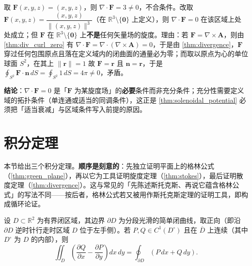 \begin{example}\label{ex:solenoidal_not_curl}
取 $\mathbf F(x,y,z) = (x,y,z)$，则 $\nabla\cdot\mathbf F = 3\ne0$，不合条件。改取 $\mathbf F(x,y,z)=\dfrac{(x,y,z)}{\|(x,y,z)\|^3}$（在 $\mathbb R^3\setminus\{\mathbf 0\}$ 上定义），则 $\nabla\cdot\mathbf F=0$ 在该区域上处处成立；但 $\mathbf F$ 在 $\mathbb R^3\setminus\{\mathbf 0\}$ 上\textbf{不是}任何矢量场的旋度。理由：若 $\mathbf F=\nabla\times\mathbf A$，则由 \cref{thm:div_curl_zero} 有 $\nabla\cdot\mathbf F = \nabla\cdot(\nabla\times\mathbf A)=0$，于是由 \cref{thm:divergence}，$\mathbf F$ 穿过任何包围原点且落在定义域内的闭曲面的通量必为零；而取以原点为心的单位球面 $S^2$，在其上 $\|\mathbf r\|=1$ 故 $\mathbf F=\mathbf r$ 且 $\mathbf n=\mathbf r$，于是 $\oint_{S^2}\mathbf F\cdot\mathbf n\,dS=\oint_{S^2}1\,dS=4\pi\ne0$，矛盾。

\textbf{结论}：$\nabla\cdot\mathbf F=0$ 是「$\mathbf F$ 为某旋度场」的\textbf{必要}条件而非充分条件；充分性需要定义域的拓扑条件（单连通或适当的同调条件），这正是 \cref{thm:solenoidal_potential} 必须把「适当衰减」与区域条件写入前提的原因。
\end{example}

\section{积分定理}\label{sec:integral_theorems}

本节给出三个积分定理。\textbf{顺序是刻意的}：先独立证明平面上的格林公式（\cref{thm:green_plane}），再以它为工具证明旋度定理（\cref{thm:stokes}），最后证明散度定理（\cref{thm:divergence}）。这与常见的「先陈述斯托克斯、再说它蕴含格林公式」的写法不同——按后者，格林公式若又被用作斯托克斯定理的证明工具，即构成循环论证。

\begin{theorem}\label{thm:green_plane}
设 $D \subset \mathbb{R}^2$ 为有界闭区域，其边界 $\partial D$ 为分段光滑的简单闭曲线，取正向（即沿 $\partial D$ 逆时针行走时区域 $D$ 位于左手侧）。若 $P, Q \in C^1(D^\circ)$ 且在 $\overline{D}$ 上连续（其中 $D^\circ$ 为 $D$ 的内部），则
\[
\iint_D \left( \frac{\partial Q}{\partial x} - \frac{\partial P}{\partial y} \right) dx\, dy = \oint_{\partial D} (P \, dx + Q \, dy).
\]
\end{theorem}

